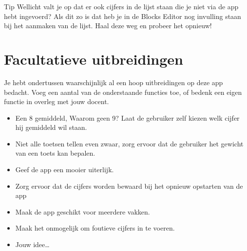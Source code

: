 \begin{derivation}{Tip}
Wellicht valt je op dat er ook cijfers in de lijst staan die je niet via de app hebt ingevoerd? Als dit zo is dat heb je in de Blocks Editor nog invulling staan bij het aanmaken van de lijst. Haal deze weg en probeer het opnieuw!
\end{derivation}

\section{Facultatieve uitbreidingen}
Je hebt ondertussen waarschijnlijk al een hoop uitbreidingen op deze app bedacht. Voeg een aantal van de onderstaande functies toe, of bedenk een eigen functie in overleg met jouw docent.

\begin{itemize}
  \item Een 8 gemiddeld, Waarom geen 9? Laat de gebruiker zelf kiezen welk cijfer hij gemiddeld wil staan.
  \item Niet alle toetsen tellen even zwaar, zorg ervoor dat de gebruiker het gewicht van een toets kan bepalen.
  \item Geef de app een mooier uiterlijk.
  \item Zorg ervoor dat de cijfers worden bewaard bij het opnieuw opstarten van de app
  \item Maak de app geschikt voor meerdere vakken.
  \item Maak het onmogelijk om foutieve cijfers in te voeren.
  \item Jouw idee\dots
\end{itemize}
